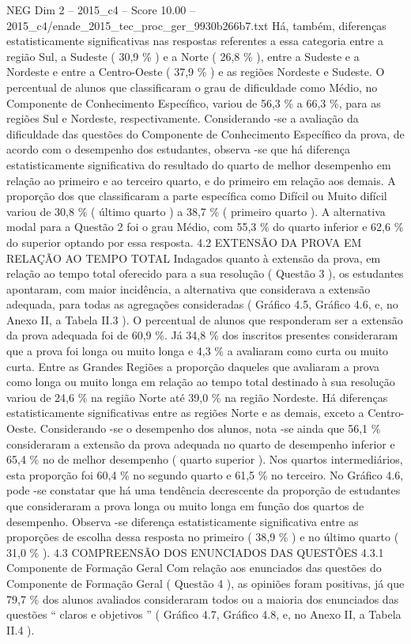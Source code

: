 \begin{textsample}{NEG Dim 2 – 2015\_c4 – Score 10.00 – 2015\_c4/enade\_2015\_tec\_proc\_ger\_9930b266b7.txt}
Há, também, diferenças estatisticamente significativas nas respostas referentes a essa categoria entre a região Sul, a Sudeste ( 30,9 \% ) e a Norte ( 26,8 \% ), entre a Sudeste e a Nordeste e entre a Centro-Oeste ( 37,9 \% ) e as regiões Nordeste e Sudeste.
O percentual de alunos que classificaram o grau de dificuldade como Médio, no Componente de Conhecimento Específico, variou de 56,3 \% a 66,3 \%, para as regiões Sul e Nordeste, respectivamente.
Considerando -se a avaliação da dificuldade das questões do Componente de Conhecimento Específico da prova, de acordo com o desempenho dos estudantes, observa -se que há diferença estatisticamente significativa do resultado do quarto de melhor desempenho em relação ao primeiro e ao terceiro quarto, e do primeiro em relação aos demais.
A proporção dos que classificaram a parte específica como Difícil ou Muito difícil variou de 30,8 \% ( último quarto ) a 38,7 \% ( primeiro quarto ).
A alternativa modal para a Questão 2 foi o grau Médio, com 55,3 \% do quarto inferior e 62,6 \% do superior optando por essa resposta. 4.2 EXTENSÃO DA PROVA EM RELAÇÃO AO TEMPO TOTAL Indagados quanto à extensão da prova, em relação ao tempo total oferecido para a sua resolução ( Questão 3 ), os estudantes apontaram, com maior incidência, a alternativa que considerava a extensão adequada, para todas as agregações consideradas ( Gráfico 4.5, Gráfico 4.6, e, no Anexo II, a Tabela II.3 ).
O percentual de alunos que responderam ser a extensão da prova adequada foi de 60,9 \%.
Já 34,8 \% dos inscritos presentes consideraram que a prova foi longa ou muito longa e 4,3 \% a avaliaram como curta ou muito curta.
Entre as Grandes Regiões a proporção daqueles que avaliaram a prova como longa ou muito longa em relação ao tempo total destinado à sua resolução variou de 24,6 \% na região Norte até 39,0 \% na região Nordeste.
Há diferenças estatisticamente significativas entre as regiões Norte e as demais, exceto a Centro-Oeste.
Considerando -se o desempenho dos alunos, nota -se ainda que 56,1 \% consideraram a extensão da prova adequada no quarto de desempenho inferior e 65,4 \% no de melhor desempenho ( quarto superior ).
Nos quartos intermediários, esta proporção foi 60,4 \% no segundo quarto e 61,5 \% no terceiro.
No Gráfico 4.6, pode -se constatar que há uma tendência decrescente da proporção de estudantes que consideraram a prova longa ou muito longa em função dos quartos de desempenho.
Observa -se diferença estatisticamente significativa entre as proporções de escolha dessa resposta no primeiro ( 38,9 \% ) e no último quarto ( 31,0 \% ). 4.3 COMPREENSÃO DOS ENUNCIADOS DAS QUESTÕES 4.3.1 Componente de Formação Geral Com relação aos enunciados das questões do Componente de Formação Geral ( Questão 4 ), as opiniões foram positivas, já que 79,7 \% dos alunos avaliados consideraram todos ou a maioria dos enunciados das questões “ claros e objetivos ” ( Gráfico 4.7, Gráfico 4.8, e, no Anexo II, a Tabela II.4 ).

\end{textsample}
